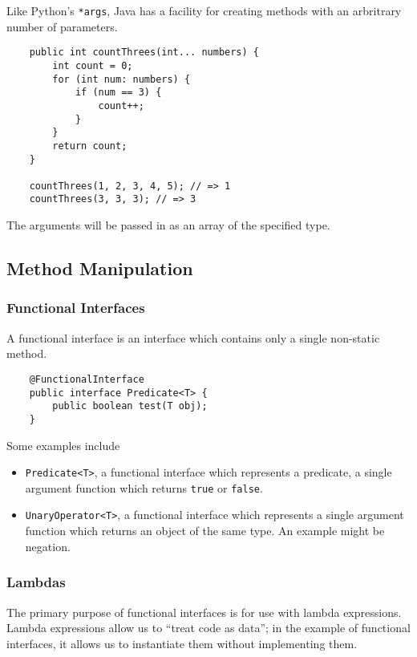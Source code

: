 \documentclass[12pt]{report}
\newcommand{\code}[1]{\lstinline{#1}}
\begin{document}
\begin{flushleft}
Like Python's \code{*args}, Java has a facility for creating methods with an
arbritrary number of parameters.

\begin{lstlisting}
    public int countThrees(int... numbers) {
        int count = 0;
        for (int num: numbers) {
            if (num == 3) {
                count++;
            }
        }
        return count;
    }

    countThrees(1, 2, 3, 4, 5); // => 1
    countThrees(3, 3, 3); // => 3
\end{lstlisting}

The arguments will be passed in as an array of the specified type.

\subsection*{Method Manipulation}

\subsubsection*{Functional Interfaces}

A functional interface is an interface which contains only a single non-static
method.

\begin{lstlisting}
    @FunctionalInterface
    public interface Predicate<T> {
        public boolean test(T obj);
    }
\end{lstlisting}

Some examples include

\begin{itemize}
    \item \code{Predicate<T>}, a functional interface which represents a
        predicate, a single argument function which returns \code{true} or
        \code{false}.
    \item \code{UnaryOperator<T>}, a functional interface which represents a
        single argument function which returns an object of the same type. An
        example might be negation.
\end{itemize}

\subsubsection*{Lambdas}

The primary purpose of functional interfaces is for use with lambda
expressions. Lambda expressions allow us to ``treat code as data''; in the
example of functional interfaces, it allows us to instantiate them without
implementing them.


\end{flushleft}
\end{document}
